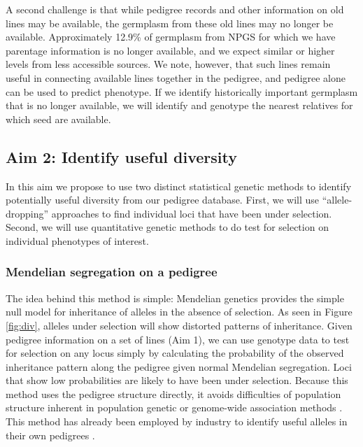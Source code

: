 \documentclass[12pt]{article}
\begin{document}
A second challenge is that while pedigree records and other information on old lines may be available, the germplasm from these old lines may no longer be available. 
Approximately 12.9\% of germplasm from NPGS for which we have parentage information is no longer available, and we expect similar or higher levels from less accessible sources. 
We note, however, that such lines remain useful in connecting available lines together in the pedigree, and pedigree alone can be used to predict phenotype. 
If we identify historically important germplasm that is no longer available, we will identify and genotype the nearest relatives for which seed are available. 

\subsection*{Aim 2: Identify useful diversity}

In this aim we propose to use two distinct statistical genetic methods to identify potentially useful diversity from our pedigree database.  
First, we will use ``allele-dropping'' approaches to find individual loci that have been under selection.
Second, we will use quantitative genetic methods to do test for selection on individual phenotypes of interest.

\subsubsection*{Mendelian segregation on a pedigree}

The idea behind this method is simple: Mendelian genetics provides the simple null model for inheritance of alleles in the absence of selection.
As seen in Figure \ref{fig:div}, alleles under selection will show distorted patterns of inheritance.
Given pedigree information on a set of lines (Aim 1), we can use genotype data to test for selection on any locus simply by calculating the probability of the observed inheritance pattern along the pedigree given normal Mendelian segregation.
Loci that show low probabilities are likely to have been under selection.
Because this method uses the pedigree structure directly, it avoids difficulties of population structure inherent in population genetic or genome-wide association methods \citep{astle2009population}.
This method has already been employed by industry to identify useful alleles in their own pedigrees \citep{sebastian1995method}.
\end{document}
